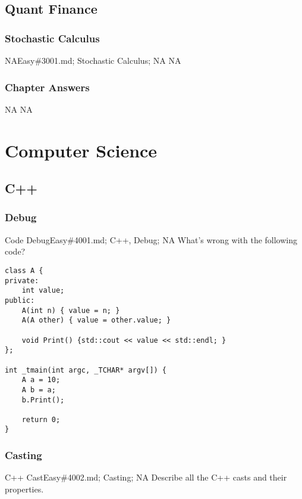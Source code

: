 \documentclass[oldfontcommands]{memoir}
\begin{document}
{\chapter{Quant Finance}
\minitoc
\section{Stochastic Calculus}
\begin{question}{NA}{Easy}{\#3001.md; Stochastic Calculus; NA}
NA

\end{question}

\newpage\section{Chapter Answers}\begin{answer}{NA}
NA
\end{answer}
\part{Computer Science}
\chapter{C++}
\minitoc
\section{Debug}
\begin{question}{Code Debug}{Easy}{\#4001.md; C++, Debug; NA}
What's wrong with the following code?

\begin{verbatim}
class A {
private:
    int value;
public:
    A(int n) { value = n; }
    A(A other) { value = other.value; }

    void Print() {std::cout << value << std::endl; }
};

int _tmain(int argc, _TCHAR* argv[]) {
    A a = 10;
    A b = a;
    b.Print();

    return 0;
}
\end{verbatim}


\end{question}

\section{Casting}
\begin{question}{C++ Cast}{Easy}{\#4002.md; Casting; NA}
Describe all the C++ casts and their properties.


\end{question}}
\end{document}
